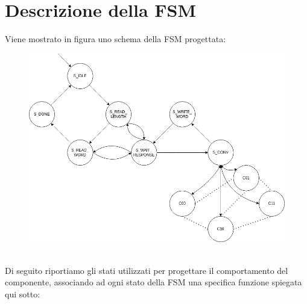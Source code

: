 \section{Descrizione della FSM}
Viene mostrato in figura uno schema della FSM progettata:
\\
\begin{figure}[ht]
    \centering
    \includegraphics[width=\textwidth,height=0.74\textheight,keepaspectratio]{images/FSM.png}
    \label{fig:FSM}
\end{figure}
\\
Di seguito riportiamo gli stati utilizzati per progettare il comportamento del componente, associando ad ogni stato della FSM una specifica funzione spiegata qui sotto:
